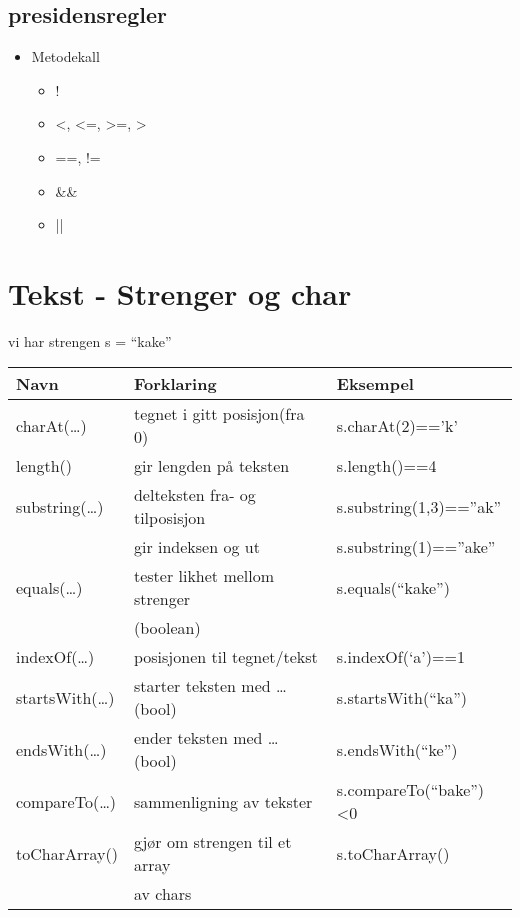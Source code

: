 \documentclass[11pt]{article}
\begin{document}
\subsection{presidensregler}
\label{sec-2-1}


\begin{itemize}
\item Metodekall
\begin{itemize}
\item !
\item <, <=, >=, >
\item ==, !=
\item \&\&
\item ||
\end{itemize}
\end{itemize}
\section{Tekst - Strenger og char}
\label{sec-3}


  vi har strengen s = ``kake''
  

\begin{center}
\begin{tabular}{lll}
\hline
 Navn                  &  Forklaring                           &  Eksempel                  \\
\hline
 charAt(\ldots{})      &  tegnet i gitt posisjon(fra 0)        &  s.charAt(2)=='k'          \\
\hline
 length()              &  gir lengden på teksten               &  s.length()==4             \\
\hline
 substring(\ldots{})   &  delteksten fra- og tilposisjon       &  s.substring(1,3)==''ak''  \\
                       &  gir indeksen og ut                   &  s.substring(1)==''ake''   \\
\hline
 equals(\ldots{})      &  tester likhet mellom strenger        &  s.equals(``kake'')        \\
                       &  (boolean)                            &                            \\
\hline
 indexOf(\ldots{})     &  posisjonen til tegnet/tekst          &  s.indexOf(`a')==1         \\
\hline
 startsWith(\ldots{})  &  starter teksten med \ldots{} (bool)  &  s.startsWith(``ka'')      \\
\hline
 endsWith(\ldots{})    &  ender teksten med \ldots{} (bool)    &  s.endsWith(``ke'')        \\
\hline
 compareTo(\ldots{})   &  sammenligning av tekster             &  s.compareTo(``bake'')<0   \\
\hline
 toCharArray()         &  gjør om strengen til et array        &  s.toCharArray()           \\
                       &  av chars                             &                            \\
\hline
\end{tabular}
\end{center}
\end{document}
